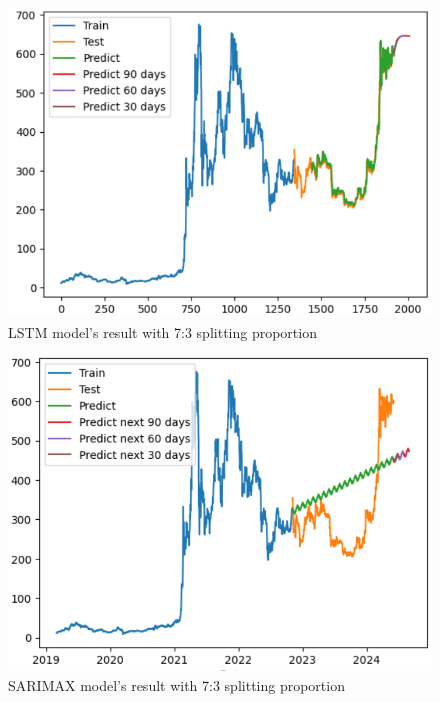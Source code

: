 \documentclass{ieeeojies}
\begin{document}
\begin{figure}[H]
	\centering
	\begin{minipage}{0.8\linewidth}
		\centering
		\includegraphics[width=\linewidth]{bibliography/Images/LSTM_BNB_73.PNG}
		\caption{LSTM model's result with 7:3 splitting proportion}
	\end{minipage}
\end{figure}
\begin{figure}[H]
	\centering
	\begin{minipage}{0.8\linewidth}
		\centering
		\includegraphics[width=\linewidth]{bibliography/Images/SARIMAX_BNB_73.PNG}
		\caption{SARIMAX model's result with 7:3 splitting proportion}
	\end{minipage}
\end{figure}
\end{document}
